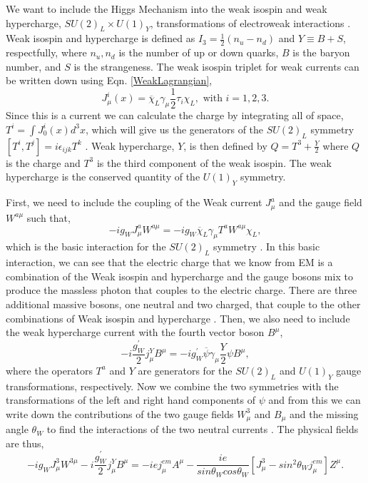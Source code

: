 We want to include the Higgs Mechanism into the weak isospin and weak hypercharge, $SU(2)_L\times U(1)_Y$, transformations of electroweak interactions \cite{halzen_quarks_1984, griffiths_introduction_2008}. Weak isospin and hypercharge is defined as $I_3=\frac{1}{2}(n_u-n_d)$ and $Y\equiv B+S$, respectfully, where $n_u,n_d$ is the number of up or down quarks, $B$ is the baryon number, and $S$ is the strangeness. The weak isospin triplet for weak currents can be written down using Eqn. \ref{WeakLagrangian}, 
\begin{equation}\label{WeakIsospinCurrent}
J_\mu^i(x)=\overline{\chi}_L\gamma_\mu\frac{1}{2}\tau_i\chi_L, \text{ with } i=1,2,3.
\end{equation}
Since this is a current we can calculate the charge by integrating all of space, $T^i=\int J_0^i(x)d^3x$, which will give us the generators of the $SU(2)_L$ symmetry $[T^i,T^j]=i\epsilon_{ijk}T^k$ \cite{halzen_quarks_1984, griffiths_introduction_2008}. Weak hypercharge, $Y$, is then defined by $Q=T^3+\frac{Y}{2}$ where $Q$ is the charge and $T^3$ is the third component of the weak isospin. The weak hypercharge is the conserved quantity of the $U(1)_Y$ symmetry. 

First, we need to include the coupling of the Weak current $J^a_\mu$ and the gauge field $W^{a\mu}$ such that,
\begin{equation}
-ig_WJ^a_\mu W^{a\mu}=-ig_W\overline{\chi}_L\gamma_\mu T^aW^{a\mu}\chi_L,
\end{equation}
which is the basic interaction for the $SU(2)_L$ symmetry \cite{halzen_quarks_1984, griffiths_introduction_2008}. In this basic interaction, we can see that the electric charge that we know from EM is a combination of the Weak isospin and hypercharge and the gauge bosons mix to produce the massless photon that couples to the electric charge. There are three additional massive bosons, one neutral and two charged, that couple to the other combinations of Weak isospin and hypercharge \cite{halzen_quarks_1984, griffiths_introduction_2008}. Then, we also need to include the weak hypercharge current with the fourth vector boson $B^\mu$,
\begin{equation}
-i\frac{g_W^{\prime}}{2}j_\mu^YB^\mu=-ig_W^{\prime}\overline{\psi}\gamma_\mu\frac{Y}{2}\psi B^\mu, 
\end{equation}
where the operators $T^a$ and $Y$ are generators for the $SU(2)_L$ and $U(1)_Y$ gauge transformations, respectively. Now we combine the two symmetries with the transformations of the left and right hand components of $\psi$ and from this we can write down the contributions of the two gauge fields $W_\mu^3$ and $B_\mu$ and the missing angle $\theta_W$ to find the interactions of the two neutral currents \cite{halzen_quarks_1984, griffiths_introduction_2008}. The physical fields are thus,
\begin{equation}
-ig_WJ_\mu^3W^{3\mu}-i\frac{g_W^{\prime}}{2}j_\mu^YB^\mu=-iej_\mu^{em}A^\mu-\frac{ie}{sin\theta_Wcos\theta_W}[J_\mu^3-sin^2\theta_Wj_\mu^{em}]Z^\mu.
\end{equation}

